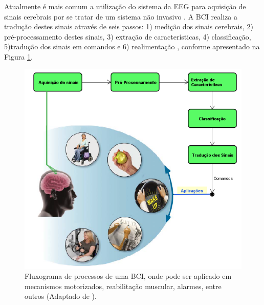 Atualmente é mais comum a utilização do sistema da EEG para aquisição de sinais cerebrais por se tratar de um sistema não invasivo \cite{CristophBCI}. A BCI realiza a tradução destes sinais através de seis passos: 1) medição dos sinais cerebrais, 2) pré-processamento destes sinais, 3) extração de características, 4) classificação, 5)tradução dos sinais em comandos e 6) realimentação \cite{MasonAndBirch}, conforme apresentado na Figura \ref{BCI_flow}.
\newline
\begin{figure}[h!]
	\centering
	\includegraphics[keepaspectratio=true,scale=1.0]{figuras/Fluxograma_BCI.PNG}
	\caption{Fluxograma de processos de uma BCI, onde pode ser aplicado em mecanismos motorizados, reabilitação muscular, alarmes, entre outros (Adaptado de \cite{BCIWolpaw}).}
	\label{BCI_flow}
\end{figure}

